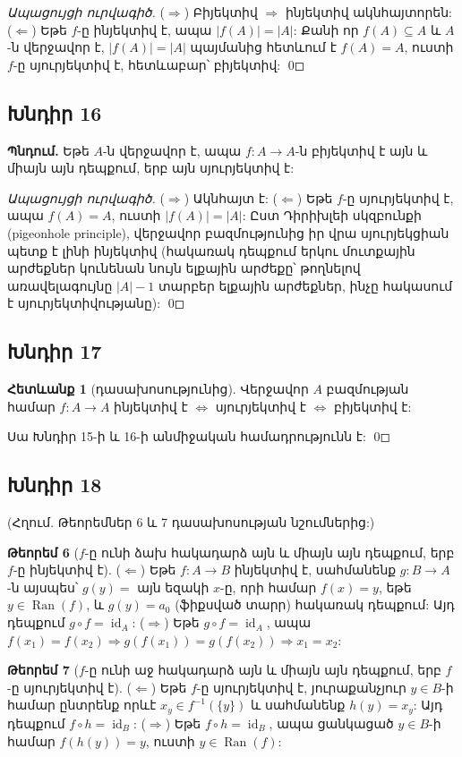 \emph{Ապացույցի ուրվագիծ.} ($\Rightarrow$) Բիյեկտիվ $\Rightarrow$ ինյեկտիվ ակնհայտորեն: ($\Leftarrow$) Եթե $f$-ը ինյեկտիվ է, ապա $|f(A)|=|A|$: Քանի որ $f(A)\subseteq A$ և $A$-ն վերջավոր է, $|f(A)|=|A|$ պայմանից հետևում է $f(A)=A$, ուստի $f$-ը սյուրյեկտիվ է, հետևաբար՝ բիյեկտիվ: \qed

\subsection*{Խնդիր 16}
\textbf{Պնդում.} Եթե $A$-ն վերջավոր է, ապա $f:A\to A$-ն բիյեկտիվ է այն և միայն այն դեպքում, երբ այն սյուրյեկտիվ է:

\emph{Ապացույցի ուրվագիծ.} ($\Rightarrow$) Ակնհայտ է: ($\Leftarrow$) Եթե $f$-ը սյուրյեկտիվ է, ապա $f(A)=A$, ուստի $|f(A)|=|A|$: Ըստ Դիրիխլեի սկզբունքի (pigeonhole principle), վերջավոր բազմությունից իր վրա սյուրյեկցիան պետք է լինի ինյեկտիվ (հակառակ դեպքում երկու մուտքային արժեքներ կունենան նույն ելքային արժեքը՝ թողնելով առավելագույնը $|A|-1$ տարբեր ելքային արժեքներ, ինչը հակասում է սյուրյեկտիվությանը): \qed

\subsection*{Խնդիր 17}
\textbf{Հետևանք 1} (դասախոսությունից). Վերջավոր $A$ բազմության համար $f:A\to A$ ինյեկտիվ է $\Leftrightarrow$ սյուրյեկտիվ է $\Leftrightarrow$ բիյեկտիվ է:

Սա Խնդիր 15-ի և 16-ի անմիջական համադրությունն է: \qed

\subsection*{Խնդիր 18}
(Հղում. Թեորեմներ 6 և 7 դասախոսության նշումներից:)

\textbf{Թեորեմ 6} ($f$-ը ունի ձախ հակադարձ այն և միայն այն դեպքում, երբ $f$-ը ինյեկտիվ է). ($\Leftarrow$) Եթե $f:A\to B$ ինյեկտիվ է, սահմանենք $g:B\to A$-ն այսպես՝ $g(y)=$ այն եզակի $x$-ը, որի համար $f(x)=y$, եթե $y\in\operatorname{Ran}(f)$, և $g(y)=a_0$ (ֆիքսված տարր) հակառակ դեպքում: Այդ դեպքում $g\circ f = \operatorname{id}_A$: ($\Rightarrow$) Եթե $g\circ f=\operatorname{id}_A$, ապա $f(x_1)=f(x_2)\Rightarrow g(f(x_1))=g(f(x_2))\Rightarrow x_1=x_2$:

\textbf{Թեորեմ 7} ($f$-ը ունի աջ հակադարձ այն և միայն այն դեպքում, երբ $f$-ը սյուրյեկտիվ է). ($\Leftarrow$) Եթե $f$-ը սյուրյեկտիվ է, յուրաքանչյուր $y\in B$-ի համար ընտրենք որևէ $x_y\in f^{-1}(\{y\})$ և սահմանենք $h(y)=x_y$: Այդ դեպքում $f\circ h=\operatorname{id}_B$: ($\Rightarrow$) Եթե $f\circ h=\operatorname{id}_B$, ապա ցանկացած $y\in B$-ի համար $f(h(y))=y$, ուստի $y\in\operatorname{Ran}(f)$:

